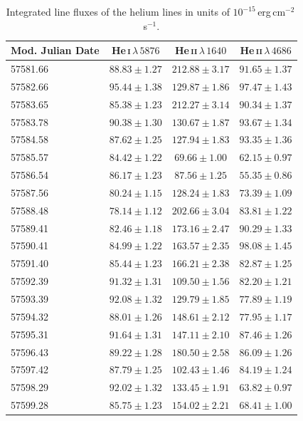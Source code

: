 \begin{table}[h]
	\centering
	\caption[Integrated line fluxes of the helium lines]{Integrated line fluxes of the helium lines in units of $10^{-15}$\,erg\,cm$^{-2}$\,s$^{-1}$.}
	\begin{tabular}{lccc}
		\hline\hline
		Mod. Julian Date & He\,\textsc{i}\,$\lambda\,5876$ & He\,\textsc{ii}\,$\lambda\,1640$ & He\,\textsc{ii}\,$\lambda\,4686$ \\
		\hline
		57581.66 & $88.83 \pm 1.27$ & $212.88 \pm 3.17$ & $91.65 \pm 1.37$ \\
		57582.66 & $95.44 \pm 1.38$ & $129.87 \pm 1.86$ & $97.47 \pm 1.43$ \\
		57583.65 & $85.38 \pm 1.23$ & $212.27 \pm 3.14$ & $90.34 \pm 1.37$ \\
		57583.78 & $90.38 \pm 1.30$ & $130.67 \pm 1.87$ & $93.67 \pm 1.34$ \\
		57584.58 & $87.62 \pm 1.25$ & $127.94 \pm 1.83$ & $93.35 \pm 1.36$ \\
		57585.57 & $84.42 \pm 1.22$ & $69.66 \pm 1.00$ & $62.15 \pm 0.97$ \\
		57586.54 & $86.17 \pm 1.23$ & $87.56 \pm 1.25$ & $55.35 \pm 0.86$ \\
		57587.56 & $80.24 \pm 1.15$ & $128.24 \pm 1.83$ & $73.39 \pm 1.09$ \\
		57588.48 & $78.14 \pm 1.12$ & $202.66 \pm 3.04$ & $83.81 \pm 1.22$ \\
		57589.41 & $82.46 \pm 1.18$ & $173.16 \pm 2.47$ & $90.29 \pm 1.33$ \\
		57590.41 & $84.99 \pm 1.22$ & $163.57 \pm 2.35$ & $98.08 \pm 1.45$ \\
		57591.40 & $85.44 \pm 1.23$ & $166.21 \pm 2.38$ & $82.87 \pm 1.25$ \\
		57592.39 & $91.32 \pm 1.31$ & $109.50 \pm 1.56$ & $82.20 \pm 1.21$ \\
		57593.39 & $92.08 \pm 1.32$ & $129.79 \pm 1.85$ & $77.89 \pm 1.19$ \\
		57594.32 & $88.01 \pm 1.26$ & $148.61 \pm 2.12$ & $77.95 \pm 1.17$ \\
		57595.31 & $91.64 \pm 1.31$ & $147.11 \pm 2.10$ & $87.46 \pm 1.26$ \\
		57596.43 & $89.22 \pm 1.28$ & $180.50 \pm 2.58$ & $86.09 \pm 1.26$ \\
		57597.42 & $87.79 \pm 1.25$ & $102.43 \pm 1.46$ & $84.19 \pm 1.24$ \\
		57598.29 & $92.02 \pm 1.32$ & $133.45 \pm 1.91$ & $63.82 \pm 0.97$ \\
		57599.28 & $85.75 \pm 1.23$ & $154.02 \pm 2.21$ & $68.41 \pm 1.00$ \\

\end{tabular}
\end{table}
